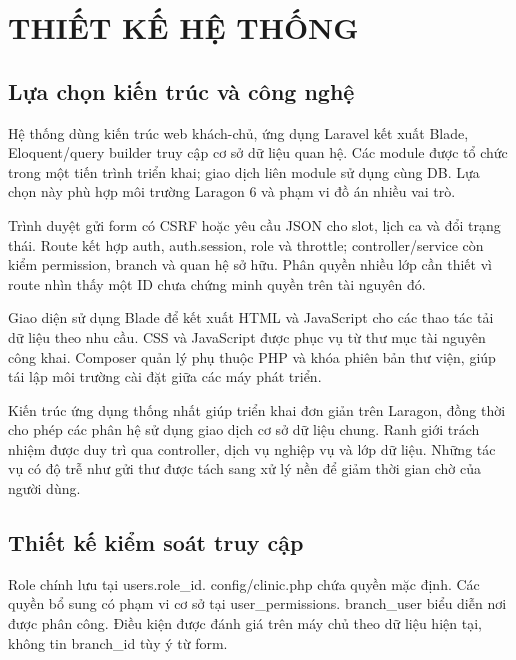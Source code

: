 \chapter{THIẾT KẾ HỆ THỐNG}\label{ch:design}

\section{Lựa chọn kiến trúc và công nghệ}
Hệ thống dùng kiến trúc web khách-chủ, ứng dụng Laravel kết xuất Blade, Eloquent/\allowbreak{}query builder truy cập cơ sở dữ liệu quan hệ.\allowbreak{} Các module được tổ chức trong một tiến trình triển khai; giao dịch liên module sử dụng cùng DB.\allowbreak{} Lựa chọn này phù hợp môi trường Laragon 6 và phạm vi đồ án nhiều vai trò.\allowbreak{}

Trình duyệt gửi form có CSRF hoặc yêu cầu JSON cho slot, lịch ca và đổi trạng thái.\allowbreak{} Route kết hợp auth, auth.\allowbreak{}session, role và throttle; controller/\allowbreak{}service còn kiểm permission, branch và quan hệ sở hữu.\allowbreak{} Phân quyền nhiều lớp cần thiết vì route nhìn thấy một ID chưa chứng minh quyền trên tài nguyên đó.\allowbreak{}

Giao diện sử dụng Blade để kết xuất HTML và Java\allowbreak{}Script cho các thao tác tải dữ liệu theo nhu cầu.\allowbreak{} CSS và Java\allowbreak{}Script được phục vụ từ thư mục tài nguyên công khai.\allowbreak{} Composer quản lý phụ thuộc PHP và khóa phiên bản thư viện, giúp tái lập môi trường cài đặt giữa các máy phát triển.\allowbreak{}

Kiến trúc ứng dụng thống nhất giúp triển khai đơn giản trên Laragon, đồng thời cho phép các phân hệ sử dụng giao dịch cơ sở dữ liệu chung.\allowbreak{} Ranh giới trách nhiệm được duy trì qua controller, dịch vụ nghiệp vụ và lớp dữ liệu.\allowbreak{} Những tác vụ có độ trễ như gửi thư được tách sang xử lý nền để giảm thời gian chờ của người dùng.\allowbreak{}


\section{Thiết kế kiểm soát truy cập}
Role chính lưu tại users.\allowbreak{}role\_\allowbreak{}id.\allowbreak{} config/\allowbreak{}clinic.\allowbreak{}php chứa quyền mặc định.\allowbreak{} Các quyền bổ sung có phạm vi cơ sở tại user\_\allowbreak{}permissions.\allowbreak{} branch\_\allowbreak{}user biểu diễn nơi được phân công.\allowbreak{} Điều kiện được đánh giá trên máy chủ theo dữ liệu hiện tại, không tin branch\_\allowbreak{}id tùy ý từ form.\allowbreak{}

